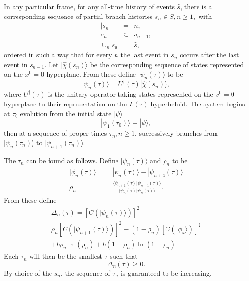\documentclass[twocolumn,amsmath,amssymb]{revtex4-1}
\begin{document}
In any particular frame, for any all-time history of events $\hat{s}$,
there is a corresponding sequence of partial branch histories
$s_n \in S, n \ge 1,$ with
\begin{subequations}
  \begin{eqnarray}
    \label{partialbranch0}
    | s_n | & = & n, \\
    \label{partialbranch1}
    s_n  & \subset & s_{n + 1}, \\
    \label{partialbranch2}
    \cup_n s_n & = & \hat{s},
  \end{eqnarray}
\end{subequations}
ordered in such a way that for every $n$  the last event in $s_n$ occurs
after the last event in $s_{n-1}$.
Let $|\hat{\chi}( s_n) \rangle $ be the corresponding sequence of states
represented on the $x^0 = 0$ hyperplane.
From these define $|\psi_n(\tau) \rangle $ to be
\begin{equation}
  \label{movedtoh}
  |\psi_n( \tau) \rangle  = U^\dagger( \tau) |\hat{\chi}(s_n) \rangle ,
\end{equation}
where  $U^\dagger(\tau)$ is the unitary operator taking states
represented on the $x^0 = 0$ hyperplane to their representation
on the $L(\tau)$ hyperbeloid. The system begins at $\tau_0$
evolution from the initial state $|\psi \rangle $
\begin{equation}
  \label{psi1psi}
  |\psi_1( \tau_0) \rangle  = |\psi \rangle ,
\end{equation}
then at a sequence of proper times
$\tau_n, n \ge 1$,
successively branches from $|\psi_n( \tau_n) \rangle $ to $|\psi_{n+1}( \tau_n) \rangle $.

The $\tau_n$ can be found
as follows.
Define
$|\psi_n(\tau) \rangle $ and $\rho_n$ to be
\begin{subequations}
  \begin{eqnarray}
    \label{psi11}
    |\phi_n(\tau) \rangle  & = &  |\psi_n( \tau) \rangle  - |\psi_{n+1}(\tau) \rangle  \\
     \label{timeview0}
    \rho_n & = & \frac{  \langle \psi_{n+1}( \tau)|\psi_{n+1}( \tau) \rangle }{  \langle \psi_n( \tau)|\psi_n( \tau) \rangle } .
  \end{eqnarray}
\end{subequations}
From these define
\begin{multline}
  \label{defdeltan}
  \Delta_n( \tau) = [C( |\psi_n( \tau)  \rangle )]^2 - \\
  \rho_n [C( |\psi_{n+1}(\tau) \rangle )]^2 - ( 1 - \rho_n) [C( |\phi_n \rangle )]^2 \\
+b \rho_n \ln( \rho_n) + b ( 1 - \rho_n) \ln( 1 - \rho_n).
\end{multline}
Each $\tau_n$ will then be the smallest $\tau$ such that
\begin{equation}
  \label{branchn}
  \Delta_n( \tau) \ge 0.
\end{equation}
By choice of the $s_n$,
the sequence of $\tau_n$ is guaranteed to be increasing.
\end{document}
